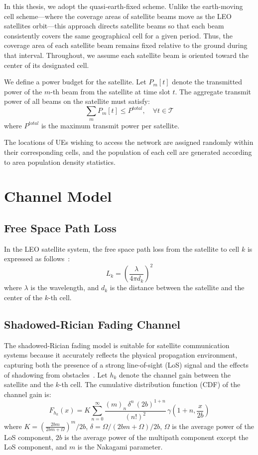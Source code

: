 In this thesis, we adopt the quasi-earth-fixed scheme. Unlike the earth-moving cell scheme—where the coverage areas of satellite beams move as the LEO satellites orbit—this approach directs satellite beams so that each beam consistently covers the same geographical cell for a given period. Thus, the coverage area of each satellite beam remains fixed relative to the ground during that interval. Throughout, we assume each satellite beam is oriented toward the center of its designated cell.

We define a power budget for the satellite. Let $P_{m}[t]$ denote the transmitted power of the $m$-th beam from the satellite at time slot $t$. The aggregate transmit power of all beams on the satellite must satisfy:
\begin{equation}
    \sum_{m} P_{m}[t] \leq P^{total}, \quad \forall t \in \mathcal{T}
\end{equation}
where $P^{total}$ is the maximum transmit power per satellite.

The locations of UEs wishing to access the network are assigned randomly within their corresponding cells, and the population of each cell are generated according to area population density statistics.

\section{Channel Model}

\subsection{Free Space Path Loss}
In the LEO satellite system, the free space path loss from the satellite to cell $k$ is expressed as follows~\cite{Satellite-Multi-Beam}:
\begin{equation}
    L_{k} = \left(\frac{\lambda}{4\pi d_{k}}\right)^2
\end{equation}
where $\lambda$ is the wavelength, and $d_{k}$ is the distance between the satellite and the center of the $k$-th cell.

\subsection{Shadowed-Rician Fading Channel}
The shadowed-Rician fading model is suitable for satellite communication systems because it accurately reflects the physical propagation environment, capturing both the presence of a strong line-of-sight (LoS) signal and the effects of shadowing from obstacles~\cite{channel-model}. Let $h_{k}$ denote the channel gain between the satellite and the $k$-th cell. The cumulative distribution function (CDF) of the channel gain is:
\begin{equation}
    F_{h_{k}}(x) = K \sum_{n=0}^{\infty} \frac{(m)_n \, \delta^n \, (2b)^{1+n}}{(n!)^2} \, \gamma\left(1+n, \frac{x}{2b}\right)
\end{equation}
where $K = \left(\frac{2bm}{2bm+\Omega}\right)^m/2b$, $\delta = \Omega/(2bm+\Omega)/2b$, $\Omega$ is the average power of the LoS component, $2b$ is the average power of the multipath component except the LoS component, and $m$ is the Nakagami parameter.

